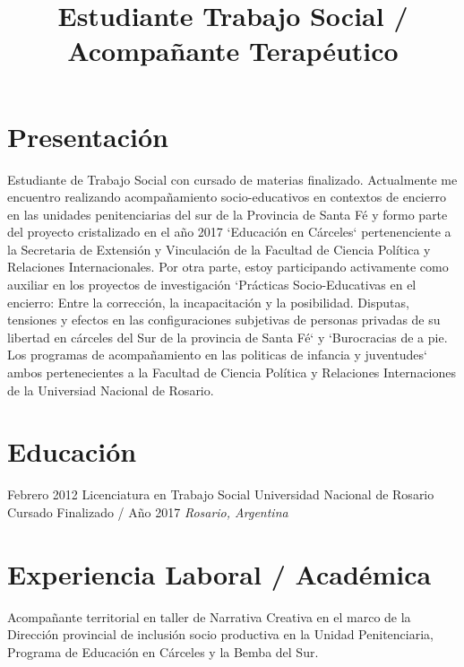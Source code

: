 \documentclass[11pt,a4paper,sans]{moderncv}        %
\title{Estudiante Trabajo Social / Acompañante Terap\'eutico}                               %
\begin{document}
\makecvtitle

\section{Presentación}
Estudiante de Trabajo Social con cursado de materias finalizado. Actualmente me encuentro realizando acompañamiento socio-educativos en contextos de encierro en las unidades penitenciarias del sur de la Provincia de Santa F\'e y formo parte del proyecto cristalizado en el año 2017 `Educación en Cárceles` pertenenciente a la Secretaria de Extensi\'on y Vinculación de la Facultad de Ciencia Pol\'itica y Relaciones Internacionales. Por otra parte, estoy participando activamente como auxiliar en los proyectos de investigaci\'on `Pr\'acticas Socio-Educativas en el encierro: Entre la correcci\'on, la incapacitación y la posibilidad. Disputas, tensiones y efectos en las configuraciones subjetivas de personas privadas de su libertad en cárceles del Sur de la provincia de Santa F\'e` y `Burocracias de a pie. Los programas de acompañamiento en las politicas de infancia y juventudes` ambos pertenecientes a la Facultad de Ciencia Pol\'itica y Relaciones Internaciones de la Universiad Nacional de Rosario.
\vspace{2mm}

\section{Educación}
\cventry
{Febrero 2012}
{Licenciatura en Trabajo Social}
{Universidad Nacional de Rosario}
{Cursado Finalizado / Año 2017}
{}
{\textit{Rosario, Argentina}}
{}
\vspace{2mm}


\section{Experiencia Laboral / Acad\'emica}
  {
    Acompañante territorial en taller de Narrativa Creativa en el marco de la Dirección provincial de inclusión socio productiva en la Unidad Penitenciaria, Programa de Educación en Cárceles y la Bemba del Sur.
  }
\vspace{3mm}
\end{document}
